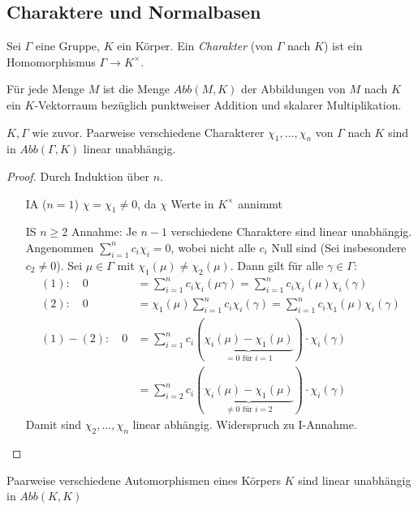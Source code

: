 \documentclass[../main.tex]{subfiles}
\begin{document}
\subsection{Charaktere und Normalbasen}
\begin{definition}
    Sei $\Gamma$ eine Gruppe, $K$ ein Körper.
    Ein \emph{Charakter} (von $\Gamma$ nach $K$) ist ein Homomorphismus $\Gamma\rightarrow K^\times$.
\end{definition}
Für jede Menge $M$ ist die Menge $Abb(M,K)$ der Abbildungen von $M$ nach $K$ ein $K$-Vektorraum bezüglich punktweiser Addition und skalarer Multiplikation.

\begin{lemma}\label{theo:3.17}
    $K, \Gamma$ wie zuvor.
    Paarweise verschiedene Charakterer $\chi_1,\dots,\chi_n$ von $\Gamma$ nach $K$ sind in $Abb(\Gamma,K)$ linear unabhängig.
\end{lemma}
\begin{proof}
    Durch Induktion über $n$.
    \begin{itemize}
        \item[IA ($n=1$)] $\chi = \chi_1\neq 0$, da $\chi$ Werte in $K^\times$ annimmt
        \item[IS $n\geq2$] 
        Annahme: Je $n-1$ verschiedene Charaktere sind linear unabhängig.
        Angenommen $\sum_{i=1}^n c_i \chi_i = 0$, wobei nicht alle $c_i$ Null sind (Sei \obda insbesondere $c_2 \neq 0$).
        Sei $\mu\in \Gamma$ mit $\chi_1(\mu) \neq \chi_2(\mu)$.
        Dann gilt für alle $\gamma \in \Gamma$:
        \begin{align*}
            (1):\quad 0 &= \sum_{i=1}^n c_i\chi_i(\mu\gamma) = \sum_{i=1} ^n c_i \chi_i(\mu) \chi_i(\gamma)\\
            (2):\quad 0 &= \chi_1(\mu)\sum_{i=1}^n c_i \chi_i(\gamma) = \sum_{i=1}^n c_i \chi_1(\mu)\chi_i(\gamma)\\
            (1) - (2):\quad 0&= \sum_{i=1}^n c_i (\underbrace{\chi_i(\mu) - \chi_1(\mu)}_{= 0\text{ für }i=1}) \cdot \chi_i(\gamma)\\
            &= \sum_{i=2}^n c_i (\underbrace{\chi_i(\mu) - \chi_1(\mu)}_{\neq 0\text{ für }i=2}) \cdot \chi_i(\gamma)
        \end{align*}
        Damit sind $\chi_2,\dots,\chi_n$ linear abhängig.
        \Lightning Widerspruch zu I-Annahme.
    \end{itemize}
\end{proof}
\begin{corollary} \label{theo:3.18}
    Paarweise verschiedene Automorphismen eines Körpers $K$ sind linear unabhängig in $Abb(K,K)$
\end{corollary}
\end{document}
